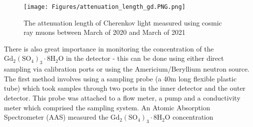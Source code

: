 \begin{figure}[H]
    \texttt{[image: Figures/attenuation\_length\_gd.PNG.png]}
    \caption{The attenuation length of Cherenkov light measured using cosmic ray muons between March of 2020 and March of 2021}
    \label{fig:gdattenuationlength}
\end{figure}

\newline

There is also great importance in monitoring the concentration of the $\mathrm{Gd}_{2}\left(\mathrm{SO}_{4}\right)_{3} \cdot 8 \mathrm{H}_{2} \mathrm{O}$ in the detector - this can be done using either direct sampling via calibration ports or using the Americium/Beryllium neutron source. The first method involves using a sampling probe (a 40m long flexible plastic tube) which took samples through two ports in the inner detector and the outer detector. This probe was attached to a flow meter, a pump and a conductivity meter which comprised the sampling system. An Atomic Absorption Spectrometer (AAS) measured the $\mathrm{Gd}_{2}\left(\mathrm{SO}_{4}\right)_{3} \cdot 8 \mathrm{H}_{2} \mathrm{O}$ concentration 






